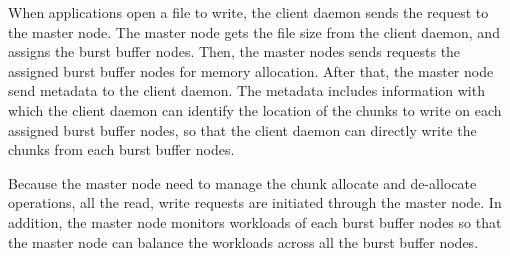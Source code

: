 When applications open a file to write, the client daemon sends the request to
the master node.
The master node gets the file size from the client daemon, and assigns the burst
buffer nodes. Then, the master nodes sends requests the assigned burst buffer
nodes for memory allocation. After that, the master node send metadata to
the client daemon. The metadata includes information with which the client daemon can identify the
location of the chunks to write on each assigned burst buffer nodes, 
so that the client daemon can directly write the chunks from each burst buffer
nodes. 

Because the master node need to manage the chunk allocate and
de-allocate operations, all the read, write requests are initiated through the
master node. In addition, the master node monitors workloads of each burst
buffer nodes so that the master node can balance the workloads across all the
burst buffer nodes.

% 
% 
% 
% 
